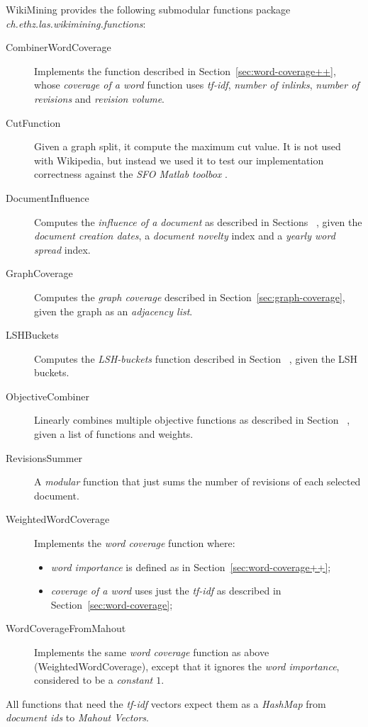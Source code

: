 WikiMining provides the following submodular functions package
\emph{ch.ethz.las.wikimining.functions}:
\begin{description}
  \item[CombinerWordCoverage] Implements the function described in
  Section~\vref{sec:word-coverage++}, whose \emph{coverage of a word} function
  uses \emph{tf-idf}, \emph{number of inlinks}, \emph{number of revisions} and
  \emph{revision volume}.
  \item[CutFunction] Given a graph split, it compute the maximum cut value. It
  is not used with Wikipedia, but instead we used it to test our implementation
  correctness against the \emph{SFO Matlab toolbox} \cite{krause2010sfo}.
  \item[DocumentInfluence] Computes the \emph{influence of a document} as
  described in Sections~ , given the
  \emph{document creation dates}, a \emph{document novelty} index and a
  \emph{yearly word spread} index.
  \item[GraphCoverage] Computes the \emph{graph coverage} described in
  Section~\vref{sec:graph-coverage}, given the graph as an \emph{adjacency
  list}.
  \item[LSHBuckets] Computes the \emph{\ac{LSH}-buckets} function described in
  Section~ , given the \ac{LSH} buckets.
  \item[ObjectiveCombiner] Linearly combines multiple objective functions as
  described in Section~ , given a list of
  functions and weights.
  \item[RevisionsSummer] A \emph{modular} function that just sums the number of
  revisions of each selected document.
  \item[WeightedWordCoverage] Implements the \emph{word coverage} function
  where:
    \begin{itemize}
      \item \emph{word importance} is defined as in
      Section~\vref{sec:word-coverage++};
      \item \emph{coverage of a word} uses just the \emph{tf-idf} as described
      in Section~\vref{sec:word-coverage};
    \end{itemize}
  \item[WordCoverageFromMahout] Implements the same \emph{word coverage}
  function as above (WeightedWordCoverage), except that it ignores the
  \emph{word importance}, considered to be a \emph{constant \(1\)}.
\end{description}
All functions that need the \emph{tf-idf} vectors expect them as a
\emph{HashMap} from \emph{document ids} to \emph{Mahout Vectors}.

